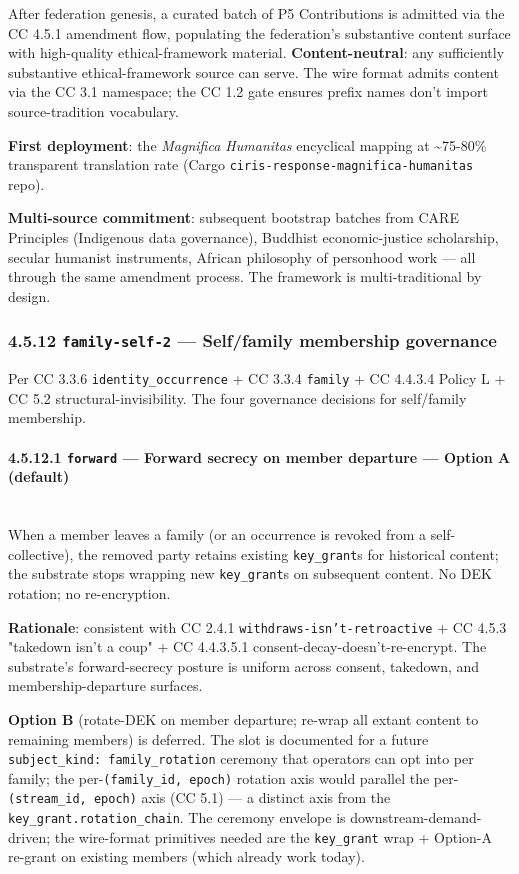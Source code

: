 \documentclass[11pt]{article}
\begin{document}
After federation genesis, a curated batch of P5 Contributions is admitted via the CC 4.5.1 amendment flow, populating the federation's substantive content surface with high-quality ethical-framework material. \textbf{Content-neutral}: any sufficiently substantive ethical-framework source can serve. The wire format admits content via the CC 3.1 namespace; the CC 1.2 gate ensures prefix names don't import source-tradition vocabulary.


\textbf{First deployment}: the \textit{Magnifica Humanitas} encyclical mapping at \textasciitilde{}75-80\% transparent translation rate (Cargo \texttt{ciris-response-magnifica-humanitas} repo).


\textbf{Multi-source commitment}: subsequent bootstrap batches from CARE Principles (Indigenous data governance), Buddhist economic-justice scholarship, secular humanist instruments, African philosophy of personhood work — all through the same amendment process. The framework is multi-traditional by design.


\subsubsection*{4.5.12 \texttt{family-self-2} — Self/family membership governance}


Per CC 3.3.6 \texttt{identity\_occurrence} + CC 3.3.4 \texttt{family} + CC 4.4.3.4 Policy L + CC 5.2 structural-invisibility. The four governance decisions for self/family membership.


\paragraph{4.5.12.1 \texttt{forward} — Forward secrecy on member departure — Option A (default)}\mbox{}\\


When a member leaves a family (or an occurrence is revoked from a self-collective), the removed party retains existing \texttt{key\_grant}s for historical content; the substrate stops wrapping new \texttt{key\_grant}s on subsequent content. No DEK rotation; no re-encryption.


\textbf{Rationale}: consistent with CC 2.4.1 \texttt{withdraws-isn't-retroactive} + CC 4.5.3 "takedown isn't a coup" + CC 4.4.3.5.1 consent-decay-doesn't-re-encrypt. The substrate's forward-secrecy posture is uniform across consent, takedown, and membership-departure surfaces.


\textbf{Option B} (rotate-DEK on member departure; re-wrap all extant content to remaining members) is deferred. The slot is documented for a future \texttt{subject\_kind: family\_rotation} ceremony that operators can opt into per family; the per-\texttt{(family\_id, epoch)} rotation axis would parallel the per-\texttt{(stream\_id, epoch)} axis (CC 5.1) — a distinct axis from the \texttt{key\_grant.rotation\_chain}. The ceremony envelope is downstream-demand-driven; the wire-format primitives needed are the \texttt{key\_grant} wrap + Option-A re-grant on existing members (which already work today).
\end{document}

